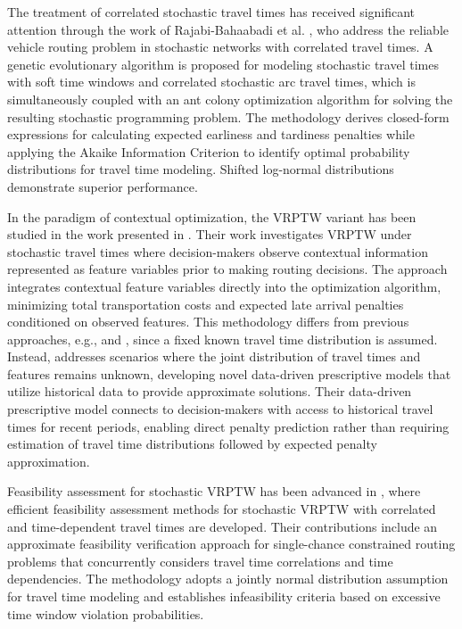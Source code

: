 \documentclass[preprint,12pt]{elsarticle}
\begin{document}
The treatment of correlated stochastic travel times has received significant attention through the work of Rajabi-Bahaabadi et al. \cite{bahaabadi-et-al}, who address the reliable vehicle routing problem in stochastic networks with correlated travel times. A genetic evolutionary algorithm is proposed for modeling stochastic travel times with soft time windows and correlated stochastic arc travel times, which is simultaneously coupled with an ant colony optimization algorithm for solving the resulting stochastic programming problem.  The methodology derives closed-form expressions for calculating expected earliness and tardiness penalties while applying the Akaike Information Criterion to identify optimal probability distributions for travel time modeling. Shifted log-normal distributions demonstrate superior performance.

In the paradigm of contextual optimization, the VRPTW variant has been studied in the work presented in \cite{Serrano-et-al}. Their work investigates VRPTW under stochastic travel times where decision-makers observe contextual information represented as feature variables prior to making routing decisions. The approach integrates contextual feature variables directly into the optimization algorithm, minimizing total transportation costs and expected late arrival penalties conditioned on observed features. This methodology differs from previous approaches, e.g., \cite{Bomboi-et-al} and \cite{bahaabadi-et-al}, since a fixed known travel time distribution is assumed. Instead, \cite{Serrano-et-al} addresses scenarios where the joint distribution of travel times and features remains unknown, developing novel data-driven prescriptive models that utilize historical data to provide approximate solutions. Their data-driven prescriptive model connects to decision-makers with access to historical travel times for recent periods, enabling direct penalty prediction rather than requiring estimation of travel time distributions followed by expected penalty approximation.

Feasibility assessment for stochastic VRPTW has been advanced in \cite{Bomboi-et-al}, where efficient feasibility assessment methods for stochastic VRPTW with correlated and time-dependent travel times are developed. Their contributions include an approximate feasibility verification approach for single-chance constrained routing problems that concurrently considers travel time correlations and time dependencies. The methodology adopts a jointly normal distribution assumption for travel time modeling and establishes infeasibility criteria based on excessive time window violation probabilities.
\end{document}
